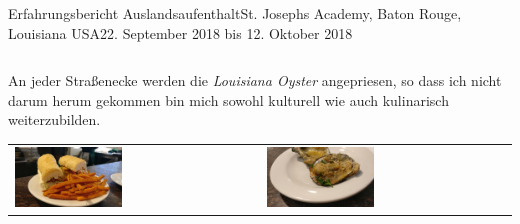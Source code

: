 \documentclass[oneside,openany,headings=optiontotoc,11pt,numbers=noenddot]{article}
\begin{document}
\begin{worksheet}{Erfahrungsbericht Auslandsaufenthalt}{St. Joseph\grq{}s Academy, Baton Rouge, Louisiana USA}{22. September 2018 bis 12. Oktober 2018}
\begin{center}
\begin{tabularx}{\textwidth}{XX}
			\end{tabularx}
		\end{center}
		An jeder Straßenecke werden die \textit{Louisiana Oyster} angepriesen, so dass ich nicht darum herum gekommen bin mich sowohl kulturell wie auch kulinarisch weiterzubilden.\\
		\begin{center}
			\begin{tabularx}{\textwidth}{XX}
				\includegraphics[width=0.45\textwidth]{../99_Bilder/00_food.jpg} & \includegraphics[width=0.45\textwidth]{../99_Bilder/01_food.jpg}
			\end{tabularx}
		\end{center}
	\end{worksheet}
\end{document}
